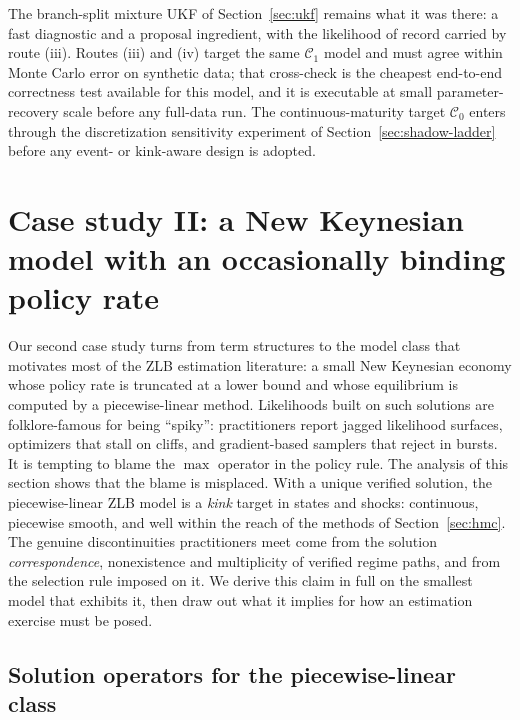 \documentclass[11pt]{article}
\begin{document}
The branch-split mixture UKF of Section~\ref{sec:ukf} remains what it was
there: a fast diagnostic and a proposal ingredient, with the likelihood of
record carried by route (iii). Routes (iii) and (iv) target the same
\(\mathcal C_1\) model and must agree within Monte Carlo error on
synthetic data; that cross-check is the cheapest end-to-end
correctness test available for this model, and it is executable at
small parameter-recovery scale before any full-data run. The
continuous-maturity target \(\mathcal C_0\) enters through the
discretization sensitivity experiment of Section~\ref{sec:shadow-ladder}
before any event- or kink-aware design is adopted.

\section{Case study II: a New Keynesian model with an occasionally binding policy rate}
\label{sec:nk}

Our second case study turns from term structures to the model class that
motivates most of the ZLB estimation literature: a small New Keynesian economy
whose policy rate is truncated at a lower bound and whose equilibrium is
computed by a piecewise-linear method. Likelihoods built on such solutions are
folklore-famous for being ``spiky'': practitioners report jagged likelihood
surfaces, optimizers that stall on cliffs, and gradient-based samplers that
reject in bursts. It is tempting to blame the $\max$ operator in the policy
rule. The analysis of this section shows that the blame is misplaced. With a
unique verified solution, the piecewise-linear ZLB model is a \emph{kink}
target in states and shocks: continuous, piecewise smooth, and well within
the reach of the methods of Section~\ref{sec:hmc}. The genuine discontinuities
practitioners meet come from the solution \emph{correspondence},
nonexistence and multiplicity of verified regime paths, and from the
selection rule imposed on it. We derive this claim in full on the smallest
model that exhibits it, then draw out what it implies for how an estimation
exercise must be posed.

\subsection{Solution operators for the piecewise-linear class}
\label{sec:nk-solvers}
\end{document}
